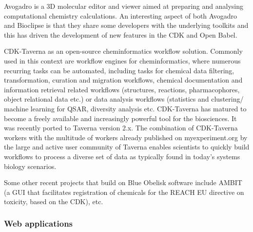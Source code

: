 \documentclass[10pt]{bmc_article}
\newenvironment{bmcformat}{\begin{raggedright}\baselineskip20pt\sloppy\setboolean{publ}{false}}{\end{raggedright}\baselineskip20pt\sloppy}
\begin{document}
\begin{bmcformat}
Avogadro is a 3D molecular editor and viewer aimed at preparing
and analysing computational chemistry calculations. An interesting
aspect of both Avogadro and Bioclipse is that they share some developers
with the underlying toolkits and this has driven the development of new
features in the CDK and Open Babel.

CDK-Taverna \cite{Kuhn:2010p4001} as an open-source cheminformatics workflow solution.
Commonly used in this context are workflow engines for cheminformatics, where numerous recurring tasks can be automated, including tasks for chemical data filtering, transformation, curation and migration workflows, chemical documentation and information retrieval related workflows (structures, reactions, pharmacophores, object relational data etc.) or data analysis workflows (statistics and clustering/ machine learning for QSAR, diversity analysis etc.
CDK-Taverna has matured to become a freely available and increasingly powerful tool for the biosciences. It was recently ported to
Taverna version 2.x.
The combination of CDK-Taverna workers with the multitude of workers
already published on myexperiment.org by the large and active user
community of Taverna enables scientists to quickly build workflows to
process a diverse set of data as typically found in today's systems
biology scenarios.

Some other recent projects that build on Blue Obelisk software include
AMBIT (a GUI that facilitates registration of chemicals for the REACH
EU directive on toxicity, based on the CDK), etc.

\subsubsection*{Web applications}


\end{bmcformat}
\end{document}
